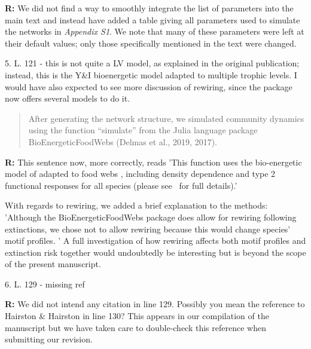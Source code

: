 \documentclass[12pt]{article}
\begin{document}

    \smallskip

    \textbf{R:} We did not find a way to smoothly integrate the list of parameters into the main text and instead have added a table giving all parameters used to simulate the networks in \emph{Appendix S1}. We note that many of these parameters were left at their default values; only those specifically mentioned in the text were changed.

    \smallskip

    5. L. 121 - this is not quite a LV model, as explained in the original publication; instead, this is the Y\&I bioenergetic model adapted to multiple trophic levels. I would have also expected to see more discussion of rewiring, since the package now offers several models to do it.

    \begin{quotation}
    After generating the network structure, we simulated community dynamics using the function ``simulate'' from the Julia language package BioEnergeticFoodWebs (Delmas et al., 2019, 2017).
    \end{quotation}

    \smallskip

    \textbf{R:} This sentence now, more correctly, reads 'This function uses the bio-energetic model of \citet{Yodzis1992} adapted to food webs \citep{Williams2007}, including density dependence and type 2 functional responses for all species (please see~\citet{Delmas2017} for full details).'
    
    With regards to rewiring, we added a brief explanation to the methods: 'Although the BioEnergeticFoodWebs package does allow for rewiring following extinctions, we chose not to allow rewiring because this would change species' motif profiles. '
    A full investigation of how rewiring affects both motif profiles and extinction risk together would undoubtedly be interesting but is beyond the scope of the present manuscript.

    \smallskip

    6. L. 129 - missing ref

    \smallskip

    \textbf{R:} We did not intend any citation in line 129. Possibly you mean the reference to Hairston \& Hairston in line 130? This appears in our compilation of the manuscript but we have taken care to double-check this reference when submitting our revision.%
\end{document}
